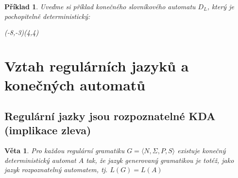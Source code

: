 \documentclass[10pt, a4paper, titlepage]{article}
\theoremstyle{note}
\newtheorem{veta}{\textbf{Věta}}
\newtheorem{priklad}{\textbf{Příklad}}
\begin{document}
\begin{priklad}
Uveďme si příklad konečného slovníkového automatu $D_{L}$, který je pochopitelně deterministický:



\begin{VCPicture}{(-8,-3)(4,4)}
\LargeState
{}



\end{VCPicture}

\end{priklad}


\section{Vztah regulárních jazyků a konečných automatů}

\subsection{Regulární jazky jsou rozpoznatelné KDA (implikace zleva)}

\begin{veta}
Pro každou regulární gramatiku $G=\langle N,\Sigma,P,S \rangle$ existuje konečný deterministický automat $A$ tak, že jazyk generovaný gramatikou je totéž, jako jazyk rozpoznatelný automatem, tj. $L(G)=L(A)$
\end{veta} 
\end{document}
